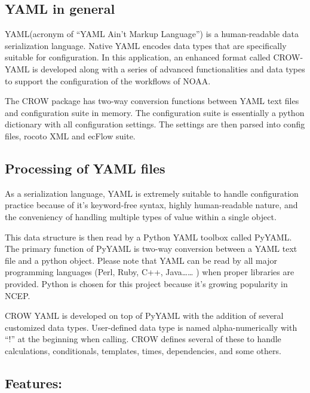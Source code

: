 \subsection*{Y\-A\-M\-L in general }

Y\-A\-M\-L(acronym of “\-Y\-A\-M\-L Ain't Markup Language”) is a human-\/readable data serialization language. Native Y\-A\-M\-L encodes data types that are specifically suitable for configuration. In this application, an enhanced format called C\-R\-O\-W-\/\-Y\-A\-M\-L is developed along with a series of advanced functionalities and data types to support the configuration of the workflows of N\-O\-A\-A.

The C\-R\-O\-W package has two-\/way conversion functions between Y\-A\-M\-L text files and configuration suite in memory. The configuration suite is essentially a python dictionary with all configuration settings. The settings are then parsed into config files, rocoto X\-M\-L and ec\-Flow suite.

\subsection*{Processing of Y\-A\-M\-L files }

As a serialization language, Y\-A\-M\-L is extremely suitable to handle configuration practice because of it’s keyword-\/free syntax, highly human-\/readable nature, and the conveniency of handling multiple types of value within a single object.

This data structure is then read by a Python Y\-A\-M\-L toolbox called Py\-Y\-A\-M\-L. The primary function of Py\-Y\-A\-M\-L is two-\/way conversion between a Y\-A\-M\-L text file and a python object. Please note that Y\-A\-M\-L can be read by all major programming languages (Perl, Ruby, C++, Java…… ) when proper libraries are provided. Python is chosen for this project because it’s growing popularity in N\-C\-E\-P.

C\-R\-O\-W Y\-A\-M\-L is developed on top of Py\-Y\-A\-M\-L with the addition of several customized data types. User-\/defined data type is named alpha-\/numerically with “!” at the beginning when calling. C\-R\-O\-W defines several of these to handle calculations, conditionals, templates, times, dependencies, and some others.

\subsection*{Features\-: }

